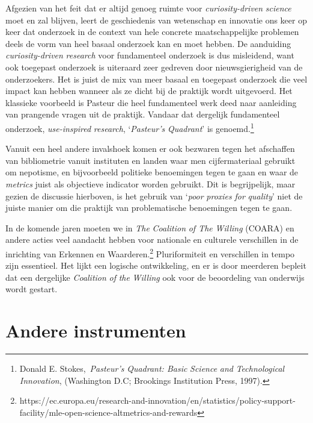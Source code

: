 \documentclass[smallauthor, chapterhaspagenum, nochapterinheader, pagenuminheader,  bigchapnum,medium2, tocpages,  garamond, titleinheader]{jote-book}
\begin{document}
	Afgezien van het feit dat er altijd genoeg ruimte voor \emph{curiosity-driven}\emph{ }\emph{science} moet en zal blijven, leert de geschiedenis van wetenschap en innovatie ons keer op keer dat onderzoek in de context van hele concrete maatschappelijke problemen deels de vorm van heel basaal onderzoek kan en moet hebben. De aanduiding \emph{curiosity-driven}\emph{ research} voor fundamenteel onderzoek is dus misleidend, want ook toegepast onderzoek is uiteraard zeer gedreven door nieuwsgierigheid van de onderzoekers. Het is juist de mix van meer basaal en toegepast onderzoek die veel impact kan hebben wanneer als ze dicht bij de praktijk wordt uitgevoerd. Het klassieke voorbeeld is Pasteur die heel fundamenteel werk deed naar aanleiding van prangende vragen uit de praktijk. Vandaar dat dergelijk fundamenteel onderzoek, \emph{use-inspired}\emph{ research}, ‘\emph{Pasteur's}\emph{ }\emph{Quadrant}' is genoemd.\footnote{Donald E. Stokes, \emph{Pasteur's}\emph{ }\emph{Quadrant}\emph{: Basic }\emph{Science}\emph{ }\emph{and}\emph{ }\emph{Technological}\emph{ }\emph{Innovation}, (Washington D.C; Brookings Institution Press, 1997).}



	Vanuit een heel andere invalshoek komen er ook bezwaren tegen het afschaffen van bibliometrie vanuit instituten en landen waar men cijfermateriaal gebruikt om nepotisme, en bijvoorbeeld politieke benoemingen tegen te gaan en waar de \emph{metrics} juist als objectieve indicator worden gebruikt. Dit is begrijpelijk, maar gezien de discussie hierboven, is het gebruik van ‘\emph{poor}\emph{ }\emph{proxies}\emph{ }\emph{for}\emph{ }\emph{quality}' niet de juiste manier om die praktijk van problematische benoemingen tegen te gaan.



	In de komende jaren moeten we in \emph{The }\emph{Coalition}\emph{ of The }\emph{Willing} (COARA) en andere acties veel aandacht hebben voor nationale en culturele verschillen in de inrichting van Erkennen en Waarderen.\footnote{https://ec.europa.eu/research-and-innovation/en/statistics/policy-support-facility/mle-open-science-altmetrics-and-rewards} Pluriformiteit en verschillen in tempo zijn essentieel. Het lijkt een logische ontwikkeling, en er is door meerderen bepleit dat een dergelijke \emph{Coalition}\emph{ of }\emph{the}\emph{ }\emph{Willing} ook voor de beoordeling van onderwijs wordt gestart.



	\section{Andere instrumenten}
\end{document}
